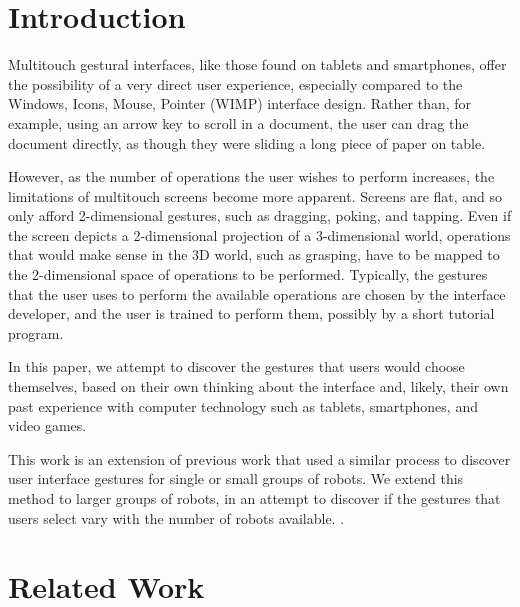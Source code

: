 \documentclass[]{article}
\title{}
\author{}
\begin{document}
\maketitle

\begin{abstract}

\end{abstract}

\section{Introduction}

Multitouch gestural interfaces, like those found on tablets and smartphones, offer the possibility of a very direct user experience, especially compared to the Windows, Icons, Mouse, Pointer (WIMP) interface design. 
Rather than, for example, using an arrow key to scroll in a document, the user can drag the document directly, as though they were sliding a long piece of paper on table. 

However, as the number of operations the user wishes to perform increases, the limitations of multitouch screens become more apparent. 
Screens are flat, and so only afford 2-dimensional gestures, such as dragging, poking, and tapping. 
Even if the screen depicts a 2-dimensional projection of a 3-dimensional world, operations that would make sense in the 3D world, such as grasping, have to be mapped to the 2-dimensional space of operations to be performed. Typically,  the gestures that the user uses to perform the available operations are chosen by the interface developer, and the user is trained to perform them, possibly by a short tutorial program. 

In this paper, we attempt to discover the gestures that users would choose themselves, based on their own thinking about the interface and, likely, their own past experience with computer technology such as tablets, smartphones, and video games. 

This work is an extension of previous work that used a similar process to discover user interface gestures for single or small groups of robots. We extend this method to larger groups of robots, in an attempt to discover if the gestures that users select vary with the number of robots available. . 

\section{Related Work}
\end{document}
